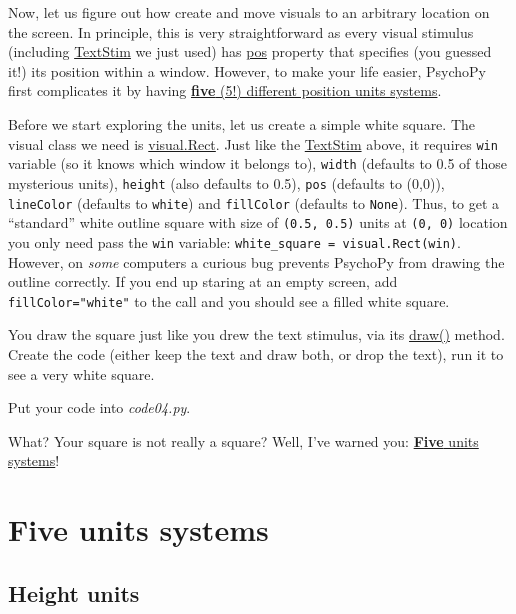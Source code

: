\documentclass[
]{book}
\begin{document}
Now, let us figure out how create and move visuals to an arbitrary location on the screen. In principle, this is very straightforward as every visual stimulus (including \href{https://psychopy.org/api/visual/textstim.html\#psychopy.visual.TextStim}{TextStim} we just used) has \href{https://psychopy.org/api/visual/textstim.html\#psychopy.visual.TextStim.pos}{pos} property that specifies (you guessed it!) its position within a window. However, to make your life easier, PsychoPy first complicates it by having \href{https://psychopy.org/general/units.html}{\textbf{five} (5!) different position units systems}.

Before we start exploring the units, let us create a simple white square. The visual class we need is \href{https://psychopy.org/api/visual/rect.html}{visual.Rect}. Just like the \href{https://psychopy.org/api/visual/textstim.html\#psychopy.visual.TextStim}{TextStim} above, it requires \texttt{win} variable (so it knows which window it belongs to), \texttt{width} (defaults to 0.5 of those mysterious units), \texttt{height} (also defaults to 0.5), \texttt{pos} (defaults to (0,0)), \texttt{lineColor} (defaults to \texttt{white}) and \texttt{fillColor} (defaults to \texttt{None}). Thus, to get a ``standard'' white outline square with size of \texttt{(0.5,\ 0.5)} units at \texttt{(0,\ 0)} location you only need pass the \texttt{win} variable: \texttt{white\_square\ =\ visual.Rect(win)}. However, on \emph{some} computers a curious bug prevents PsychoPy from drawing the outline correctly. If you end up staring at an empty screen, add \texttt{fillColor="white"} to the call and you should see a filled white square.

You draw the square just like you drew the text stimulus, via its \href{https://psychopy.org/api/visual/rect.html\#psychopy.visual.rect.Rect.draw}{draw()} method. Create the code (either keep the text and draw both, or drop the text), run it to see a very white square.

Put your code into \emph{code04.py}.

What? Your square is not really a square? Well, I've warned you: \href{https://psychopy.org/general/units.html\#units}{\textbf{Five} units systems}!

\hypertarget{psychopy-units}{%
\section{Five units systems}\label{psychopy-units}}

\hypertarget{psychopy-units-height}{%
\subsection{Height units}\label{psychopy-units-height}}
\end{document}
